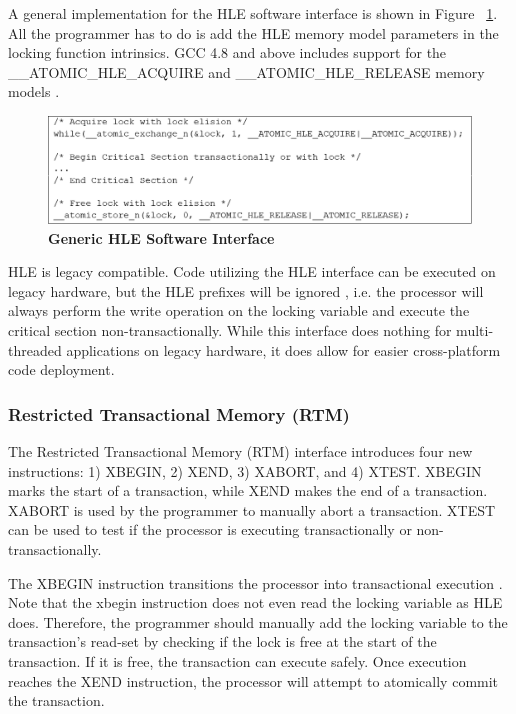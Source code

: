 \documentclass[a4paper]{article}
\begin{document}
\indent 
A general implementation for the HLE software interface is shown in Figure
~\ref{fig:hle_interface}.  All the programmer has to do is add the HLE memory
model parameters in the locking function intrinsics.  GCC 4.8 and above includes
support for the \_\_ATOMIC\_HLE\_ACQUIRE and \_\_ATOMIC\_HLE\_RELEASE memory
models \cite{gcc}.
\par

\begin{figure}[H]
    \centering
    \graphicspath{ {./figures/} }
    \includegraphics[width=\textwidth,height=\textheight,keepaspectratio]{fig_hleInterface}
    \caption{\textbf{Generic HLE Software Interface}}
    \label{fig:hle_interface}
\end{figure}

\indent
HLE is legacy compatible.  Code utilizing the HLE interface can be executed on
legacy hardware, but the HLE prefixes will be ignored \cite{intel_prog_ref},
i.e. the processor will always perform the write operation on the locking
variable and execute the critical section non-transactionally.  While this
interface does nothing for multi-threaded applications on legacy hardware, it
does allow for easier cross-platform code deployment.
\par

\subsubsection{\textbf{Restricted Transactional Memory (RTM)}}

\indent 
The Restricted Transactional Memory (RTM) interface introduces four new
instructions: 1) XBEGIN, 2) XEND, 3) XABORT, and 4) XTEST.  XBEGIN marks the
start of a transaction, while XEND makes the end of a transaction.  XABORT is
used by the programmer to manually abort a transaction.  XTEST can be used to
test if the processor is executing transactionally or non-transactionally.
\par

\indent 
The XBEGIN instruction transitions the processor into transactional
execution \cite{intel_prog_ref}.  Note that the xbegin instruction does not even
read the locking variable as HLE does.  Therefore, the programmer should
manually add the locking variable to the transaction's read-set by checking if
the lock is free at the start of the transaction.  If it is free, the
transaction can execute safely.  Once execution reaches the XEND instruction,
the processor will attempt to atomically commit the transaction.
\par
\end{document}

